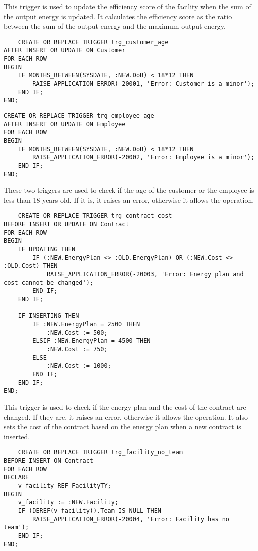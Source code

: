 This trigger is used to update the efficiency score of the facility when the sum of the output energy is updated. It calculates the efficiency score as the ratio between the sum of the output energy and the maximum output energy.

\begin{lstlisting}
    CREATE OR REPLACE TRIGGER trg_customer_age
AFTER INSERT OR UPDATE ON Customer
FOR EACH ROW
BEGIN
    IF MONTHS_BETWEEN(SYSDATE, :NEW.DoB) < 18*12 THEN
        RAISE_APPLICATION_ERROR(-20001, 'Error: Customer is a minor');
    END IF;
END;
\end{lstlisting}

\begin{lstlisting}
CREATE OR REPLACE TRIGGER trg_employee_age
AFTER INSERT OR UPDATE ON Employee
FOR EACH ROW
BEGIN
    IF MONTHS_BETWEEN(SYSDATE, :NEW.DoB) < 18*12 THEN
        RAISE_APPLICATION_ERROR(-20002, 'Error: Employee is a minor');
    END IF;
END;
\end{lstlisting}

These two triggers are used to check if the age of the customer or the employee is less than 18 years old. If it is, it raises an error, otherwise it allows the operation.

\begin{lstlisting}
    CREATE OR REPLACE TRIGGER trg_contract_cost
BEFORE INSERT OR UPDATE ON Contract
FOR EACH ROW
BEGIN
    IF UPDATING THEN
        IF (:NEW.EnergyPlan <> :OLD.EnergyPlan) OR (:NEW.Cost <> :OLD.Cost) THEN
            RAISE_APPLICATION_ERROR(-20003, 'Error: Energy plan and cost cannot be changed');
        END IF;
    END IF;

    IF INSERTING THEN
        IF :NEW.EnergyPlan = 2500 THEN
            :NEW.Cost := 500;
        ELSIF :NEW.EnergyPlan = 4500 THEN
            :NEW.Cost := 750;
        ELSE
            :NEW.Cost := 1000;
        END IF;
    END IF;
END;
\end{lstlisting}

This trigger is used to check if the energy plan and the cost of the contract are changed. If they are, it raises an error, otherwise it allows the operation. It also sets the cost of the contract based on the energy plan when a new contract is inserted.


\begin{lstlisting}
    CREATE OR REPLACE TRIGGER trg_facility_no_team
BEFORE INSERT ON Contract
FOR EACH ROW
DECLARE
    v_facility REF FacilityTY;
BEGIN
    v_facility := :NEW.Facility;
    IF (DEREF(v_facility)).Team IS NULL THEN
        RAISE_APPLICATION_ERROR(-20004, 'Error: Facility has no team');
    END IF;
END;
\end{lstlisting}

